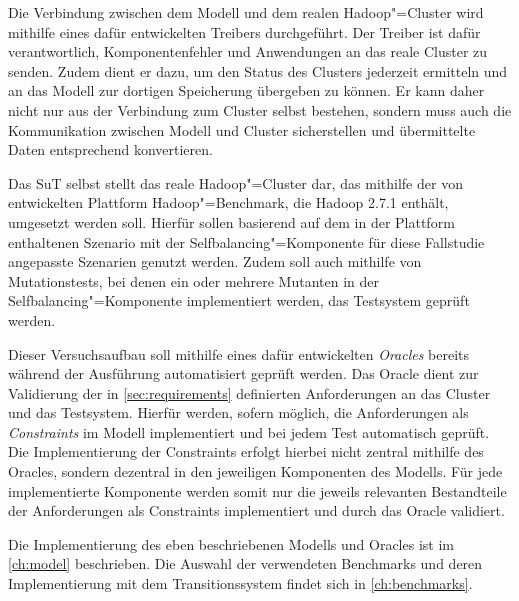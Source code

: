 Die Verbindung zwischen dem Modell und dem realen Hadoop"=Cluster wird mithilfe eines dafür entwickelten Treibers durchgeführt.
Der Treiber ist dafür verantwortlich, Komponentenfehler und Anwendungen an das reale Cluster zu senden.
Zudem dient er dazu, um den Status des Clusters jederzeit ermitteln und an das Modell zur dortigen Speicherung übergeben zu können.
Er kann daher nicht nur aus der Verbindung zum Cluster selbst bestehen, sondern muss auch die Kommunikation zwischen Modell und Cluster sicherstellen und übermittelte Daten entsprechend konvertieren.

Das \gls{SuT} selbst stellt das reale Hadoop"=Cluster dar, das mithilfe der von \citeauthor{Zhang2016} entwickelten Plattform Hadoop"=Benchmark, die Hadoop 2.7.1 enthält, umgesetzt werden soll.
Hierfür sollen basierend auf dem in der Plattform enthaltenen Szenario mit der Selfbalancing"=Komponente für diese Fallstudie angepasste Szenarien genutzt werden.
Zudem soll auch mithilfe von Mutationstests, bei denen ein oder mehrere Mutanten in der Selfbalancing"=Komponente implementiert werden, das Testsystem geprüft werden.

Dieser Versuchsaufbau soll mithilfe eines dafür entwickelten \emph{Oracles} bereits während der Ausführung automatisiert geprüft werden.
Das Oracle dient zur Validierung der in \cref{sec:requirements} definierten Anforderungen an das Cluster und das Testsystem.
Hierfür werden, sofern möglich, die Anforderungen als \emph{Constraints} im Modell implementiert und bei jedem Test automatisch geprüft.
Die Implementierung der Constraints erfolgt hierbei nicht zentral mithilfe des Oracles, sondern dezentral in den jeweiligen Komponenten des Modells.
Für jede implementierte Komponente werden somit nur die jeweils relevanten Bestandteile der Anforderungen als Constraints implementiert und durch das Oracle validiert.

Die Implementierung des eben beschriebenen Modells und Oracles ist im \cref{ch:model} beschrieben.
Die Auswahl der verwendeten Benchmarks und deren Implementierung mit dem Transitionssystem findet sich in \cref{ch:benchmarks}.
